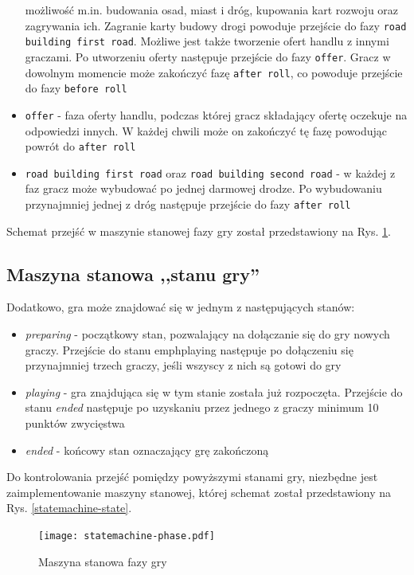 \documentclass[11pt,twoside]{report}
\providecommand{\imref}[1]{Rys. \ref{#1}} %
\begin{document}
\begin{itemize}
  możliwość m.in. budowania osad, miast i dróg, kupowania kart rozwoju
  oraz zagrywania ich. Zagranie karty budowy drogi powoduje przejście
  do fazy \texttt{road building first road}. Możliwe jest także
  tworzenie ofert handlu z innymi graczami. Po utworzeniu oferty
  następuje przejście do fazy \texttt{offer}. Gracz w dowolnym
  momencie może zakończyć fazę \texttt{after roll}, co powoduje
  przejście do fazy \texttt{before roll}
\item \texttt{offer} - faza oferty handlu, podczas której gracz
  składający ofertę oczekuje na odpowiedzi innych. W każdej chwili
  może on zakończyć tę fazę powodując powrót do \texttt{after roll}
\item \texttt{road building first road} oraz \texttt{road building second
    road} - w każdej z faz gracz może wybudować po jednej darmowej
  drodze. Po wybudowaniu przynajmniej jednej z dróg następuje
  przejście do fazy \texttt{after roll}
\end{itemize}

Schemat przejść w maszynie stanowej fazy gry został przedstawiony na
\imref{statemachine-phase}.

\subsection{Maszyna stanowa ,,stanu gry''}

Dodatkowo, gra może znajdować się w jednym z następujących stanów:

\begin{itemize}
\item \emph{preparing} - początkowy stan, pozwalający na
  dołączanie się do gry nowych graczy. Przejście do stanu
  emph{playing} następuje po dołączeniu się przynajmniej trzech
  graczy, jeśli wszyscy z nich są gotowi do gry
\item \emph{playing} - gra znajdująca się w tym stanie została już
  rozpoczęta. Przejście do stanu \emph{ended} następuje po uzyskaniu
  przez jednego z graczy minimum 10 punktów zwycięstwa
\item \emph{ended} - końcowy stan oznaczający grę zakończoną
\end{itemize}

Do kontrolowania przejść pomiędzy powyższymi stanami gry, niezbędne
jest zaimplementowanie maszyny stanowej, której schemat został
przedstawiony na \imref{statemachine-state}.

\begin{figure}[ht]
  \begin{center}
    \texttt{[image: statemachine-phase.pdf]}
  \end{center}
  \caption{Maszyna stanowa fazy gry}
  \label{statemachine-phase}
\end{figure}
\end{document}
